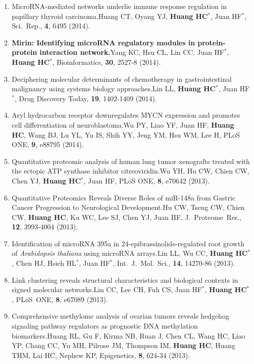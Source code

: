 \documentclass[10pt,a4paper]{article}
\def\mypub#1#2#3{{#1.}\newline #2, #3.}
\def\mybpub#1#2#3{{\boldmath \bf #1.}\newline #2, #3.}
\begin{document}
\begin{enumerate}
\item
\mypub{MicroRNA-mediated networks underlie immune response regulation in papillary thyroid carcinoma}
{Huang CT, Oyang YJ, {\bf Huang HC$^*$}, Juan HF$^*$}
{Sci.\ Rep., {\bf 4}, 6495 (2014)}

\item
\mybpub{Mirin: Identifying microRNA regulatory modules in protein-protein interaction network}
{Yang KC, Hsu CL, Lin CC, Juan HF$^*$, {\bf Huang HC$^*$}}
{Bioinformatics, {\bf 30}, 2527-8 (2014)}

\item
\mypub{Deciphering molecular determinants of chemotherapy in gastrointestinal malignancy using systems biology approaches}
{Lin LL, {\bf Huang HC$^*$}, Juan HF$^*$}
{Drug Discovery Today, {\bf 19}, 1402-1409 (2014)}

\item
\mypub{Aryl hydrocarbon receptor downregulates MYCN expression and promotes cell differentiation of neuroblastoma}
{Wu PY, Liao YF, Juan HF, {\bf Huang HC}, Wang BJ, Lu YL, Yu IS, Shih YY, Jeng YM, Hsu WM, Lee H}
{PLoS ONE, {\bf 9}, e88795 (2014)}

\item
\mypub{Quantitative proteomic analysis of human lung tumor xenografts treated with the ectopic ATP synthase inhibitor citreoviridin}
{Wu YH, Hu CW, Chien CW, Chen YJ, {\bf Huang HC$^*$}, Juan HF}
{PLoS ONE, {\bf 8}, e70642 (2013)}

\item
\mypub{Quantitative Proteomics Reveals Diverse Roles of miR-148a from Gastric Cancer Progression to Neurological Development}
{Hu CW, Tseng CW, Chien CW, {\bf Huang HC}, Ku WC, Lee SJ, Chen YJ, Juan HF}
{J.\ Proteome\ Res., {\bf 12}, 3993-4004 (2013)}

\item
\mypub{Identification of microRNA 395a in 24-epibrassinolide-regulated
root growth of \textsl{Arabidopsis thaliana} using microRNA arrays}
{Lin LL, Wu CC, {\bf Huang HC$^*$}, Chen HJ, Hsieh HL$^*$, Juan HF$^*$}
{Int.\ J.\ Mol.\ Sci., {\bf 14}, 14270-86 (2013)}

\item
\mypub{Link clustering reveals structural characteristics and biological contexts in signed molecular networks}
{Lin CC, Lee CH, Fuh CS, Juan HF$^*$, {\bf Huang HC$^*$}}
{PLoS\ ONE, {\bf 8}, e67089 (2013)}

\item
\mypub{Comprehensive methylome analysis of ovarian tumors reveals hedgehog signaling pathway regulators as prognostic DNA methylation biomarkers}
{Huang RL, Gu F, Kirma NB, Ruan J, Chen CL, Wang HC, Liao YP, Chang CC, Yu MH, Pilrose JM, Thompson IM, {\bf Huang HC}, Huang THM, Lai HC, Nephew KP}
{Epigenetics, {\bf 8}, 624-34 (2013)}


\end{enumerate}
\end{document}
